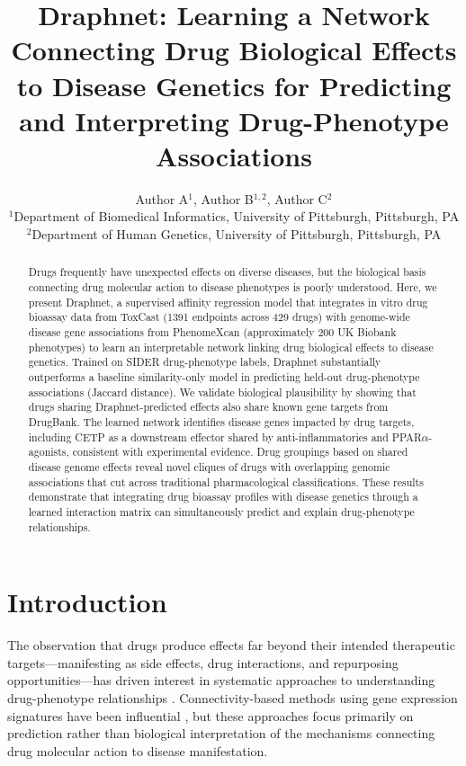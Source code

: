 \documentclass[12pt]{article}
\title{Draphnet: Learning a Network Connecting Drug Biological Effects to Disease Genetics for Predicting and Interpreting Drug-Phenotype Associations}
\author{Author A$^{1}$, Author B$^{1,2}$, Author C$^{2}$ \\
\small $^{1}$Department of Biomedical Informatics, University of Pittsburgh, Pittsburgh, PA \\
\small $^{2}$Department of Human Genetics, University of Pittsburgh, Pittsburgh, PA}
\date{}
\begin{document}
\maketitle

\begin{abstract}
Drugs frequently have unexpected effects on diverse diseases, but the biological basis connecting drug molecular action to disease phenotypes is poorly understood. Here, we present Draphnet, a supervised affinity regression model that integrates in vitro drug bioassay data from ToxCast (1391 endpoints across 429 drugs) with genome-wide disease gene associations from PhenomeXcan (approximately 200 UK Biobank phenotypes) to learn an interpretable network linking drug biological effects to disease genetics. Trained on SIDER drug-phenotype labels, Draphnet substantially outperforms a baseline similarity-only model in predicting held-out drug-phenotype associations (Jaccard distance). We validate biological plausibility by showing that drugs sharing Draphnet-predicted effects also share known gene targets from DrugBank. The learned network identifies disease genes impacted by drug targets, including CETP as a downstream effector shared by anti-inflammatories and PPAR$\alpha$-agonists, consistent with experimental evidence. Drug groupings based on shared disease genome effects reveal novel cliques of drugs with overlapping genomic associations that cut across traditional pharmacological classifications. These results demonstrate that integrating drug bioassay profiles with disease genetics through a learned interaction matrix can simultaneously predict and explain drug-phenotype relationships.
\end{abstract}

\section{Introduction}

The observation that drugs produce effects far beyond their intended therapeutic targets---manifesting as side effects, drug interactions, and repurposing opportunities---has driven interest in systematic approaches to understanding drug-phenotype relationships \citep{pushpakom2019drug}. Connectivity-based methods using gene expression signatures have been influential \citep{lamb2006connectivity, subramanian2017lincs}, but these approaches focus primarily on prediction rather than biological interpretation of the mechanisms connecting drug molecular action to disease manifestation.
\end{document}
